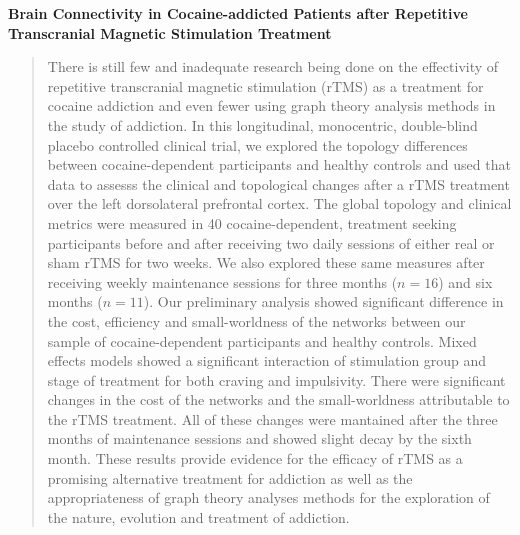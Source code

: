 \begin{center}
    \large\textbf{Brain Connectivity in Cocaine-addicted Patients after Repetitive Transcranial Magnetic Stimulation Treatment}
\end{center}
\begin{quotation}
    \noindent
    There is still few and inadequate research being done on the effectivity of repetitive transcranial magnetic stimulation (rTMS) as a treatment for cocaine addiction and even fewer using graph theory analysis methods in the study of addiction. In this longitudinal, monocentric, double-blind placebo controlled clinical trial, we explored the topology differences between cocaine-dependent participants and healthy controls and used that data to assesss the clinical and topological changes after a rTMS treatment over the left dorsolateral prefrontal cortex. The global topology and clinical metrics were measured in 40 cocaine-dependent, treatment seeking participants before and after receiving two daily sessions of either real or sham rTMS for two weeks. We also explored these same measures after receiving weekly maintenance sessions for three months ($n=16$) and  six months ($n=11$). Our preliminary analysis showed significant difference in the cost, efficiency and small-worldness of the networks between our sample of cocaine-dependent participants and healthy controls. Mixed effects models showed a significant interaction of stimulation group and stage of treatment for both craving and impulsivity. There were significant changes in the cost of the networks and the small-worldness attributable to the rTMS treatment. All of these changes were mantained after the three months of maintenance sessions and showed slight decay by the sixth month. These results provide evidence for the efficacy of rTMS as a promising alternative treatment for addiction as well as the appropriateness of graph theory analyses methods for the exploration of the nature, evolution and treatment of addiction.
\end{quotation}
\clearpage
{}
